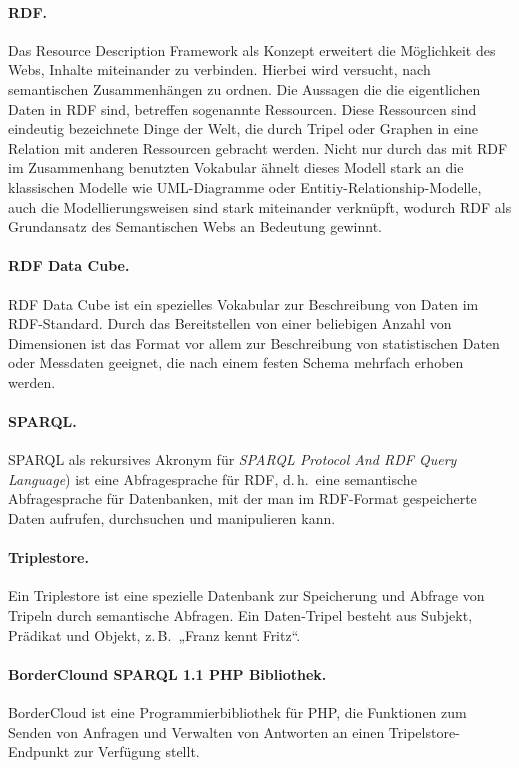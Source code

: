 \documentclass[a4paper,11pt,twoside]{article}
\begin{document}
\paragraph{RDF.}	
Das Resource Description Framework \cite{RDF} als Konzept erweitert die
Möglichkeit des Webs, Inhalte miteinander zu verbinden. Hierbei wird versucht,
nach semantischen Zusammenhängen zu ordnen. Die Aussagen die die eigentlichen
Daten in RDF sind, betreffen sogenannte Ressourcen. Diese Ressourcen sind
eindeutig bezeichnete Dinge der Welt, die durch Tripel oder Graphen in eine
Relation mit anderen Ressourcen gebracht werden. Nicht nur durch das mit RDF
im Zusammenhang benutzten Vokabular ähnelt dieses Modell stark an die
klassischen Modelle wie UML-Diagramme oder Entitiy-Relationship-Modelle, auch
die Modellierungsweisen sind stark miteinander verknüpft, wodurch RDF als
Grundansatz des Semantischen Webs an Bedeutung gewinnt.

\paragraph{RDF Data Cube.} 
RDF Data Cube \cite{RDFCube} ist ein spezielles Vokabular zur Beschreibung von
Daten im RDF-Standard. Durch das Bereitstellen von einer beliebigen Anzahl von
Dimensionen ist das Format vor allem zur Beschreibung von statistischen Daten
oder Messdaten geeignet, die nach einem festen Schema mehrfach erhoben werden.

\paragraph{SPARQL.} 
SPARQL als rekursives Akronym für \textit{SPARQL Protocol And RDF Query
  Language}) \cite{SPARQL} ist eine Abfragesprache für RDF, d.\,h.\ eine
semantische Abfragesprache für Datenbanken, mit der man im RDF-Format
gespeicherte Daten aufrufen, durchsuchen und manipulieren kann.

\paragraph{Triplestore.}	
Ein Triplestore ist eine spezielle Datenbank zur Speicherung und Abfrage von
Tripeln durch semantische Abfragen. Ein Daten-Tripel besteht aus Subjekt,
Prädikat und Objekt, z.\,B.\ „Franz kennt Fritz“.

\paragraph{BorderClound SPARQL 1.1 PHP Bibliothek.} 
BorderCloud \cite{BorderCloud} ist eine Programmierbibliothek für PHP, die
Funktionen zum Senden von Anfragen und Verwalten von Antworten an einen
Tripelstore-Endpunkt zur Verfügung stellt.
\end{document}
